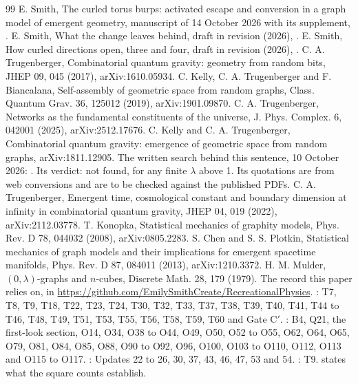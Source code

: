 \documentclass[aps,pre,10pt,twocolumn,superscriptaddress,nofootinbib]{revtex4-2}
\begin{document}
\newpage
\begin{thebibliography}{99}
 E. Smith, The curled torus burps: activated escape and conversion in a graph model of emergent
geometry, manuscript of 14 October 2026 with its supplement, .
 E. Smith, What the change leaves behind, draft in revision (2026), .
 E. Smith, How curled directions open, three and four, draft in revision (2026),
.
 C. A. Trugenberger, Combinatorial quantum gravity: geometry from random bits, JHEP 09, 045 (2017),
arXiv:1610.05934.
 C. Kelly, C. A. Trugenberger and F. Biancalana, Self-assembly of geometric space from random
graphs, Class. Quantum Grav. 36, 125012 (2019), arXiv:1901.09870.
 C. A. Trugenberger, Networks as the fundamental constituents of the universe, J. Phys. Complex. 6,
042001 (2025), arXiv:2512.17676.
 C. Kelly and C. A. Trugenberger, Combinatorial quantum gravity: emergence of geometric space from
random graphs, arXiv:1811.12905.
 The written search behind this sentence, 10 October 2026:
. Its verdict: not found, for any finite
$\lambda$ above 1. Its quotations are from web conversions and are to be checked against the published PDFs.
 C. A. Trugenberger, Emergent time, cosmological constant and boundary dimension at infinity in
combinatorial quantum gravity, JHEP 04, 019 (2022), arXiv:2112.03778.
 T. Konopka, Statistical mechanics of graphity models, Phys. Rev. D 78, 044032 (2008),
arXiv:0805.2283.
 S. Chen and S. S. Plotkin, Statistical mechanics of graph models and their implications for
emergent spacetime manifolds, Phys. Rev. D 87, 084011 (2013), arXiv:1210.3372.
 H. M. Mulder, $(0,\lambda)$-graphs and $n$-cubes, Discrete Math. 28, 179 (1979).
 The record this paper relies on, in
\url{https://github.com/EmilySmithCreate/RecreationalPhysics}. : T7, T8, T9, T18, T22,
T23, T24, T30, T32, T33, T37, T38, T39, T40, T41, T44 to T46, T48, T49, T51, T53, T55, T56, T58, T59, T60 and
Gate C$'$.
: B4, Q21, the first-look section, O14, O34, O38 to O44, O49, O50, O52 to O55, O62, O64, O65, O79,
O81, O84, O85, O88, O90 to O92, O96, O100, O103 to O110, O112, O113 and O115 to O117. : Updates 22
to 26, 30, 37, 43, 46, 47, 53 and 54. : T9.  states what the square counts establish.
\end{thebibliography}
\end{document}
